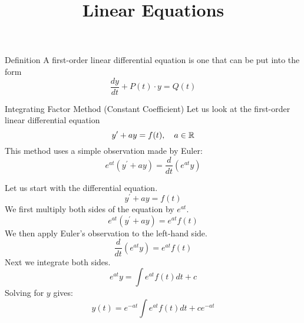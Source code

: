 \documentclass{beamer}
\title[MA230 - Section 9.5]{Linear Equations}
\begin{document}
\begin{frame}
\titlepage
\end{frame}

\begin{frame}
\begin{block}{Definition}
A first-order linear differential equation is one that can be put into the form
\begin{equation*}
\dfrac{dy}{dt}+P(t)\cdot y = Q(t)
\end{equation*}
\end{block}
\begin{block}{Integrating Factor Method (Constant Coefficient)}
Let us look at the first-order linear differential equation
\begin{equation*}
y^\prime+ ay = f(t),\quad a\in\mathbb{R}
\end{equation*}
This method uses a simple observation made by Euler:
\begin{equation*}
e^{at}\left(y^\prime+ay\right) = \dfrac{d}{dt}\left(e^{at} y\right)
\end{equation*}
\begin{overprint}
Let us start with the differential equation.
\begin{equation*}
y^\prime+ ay = f(t)
\end{equation*}
We first multiply both sides of the equation by $e^{at}$.
\begin{equation*}
e^{at}\left(y^\prime+ay\right) = e^{at} f(t) 
\end{equation*}
We then apply Euler's observation to the left-hand side.
\begin{equation*}
\dfrac{d}{dt}\left(e^{at} y\right) = e^{at} f(t) 
\end{equation*}
Next we integrate both sides.
\begin{equation*}
e^{at} y = \int e^{at} f(t)  dt + c
\end{equation*}
Solving for $y$ gives:
\begin{equation*}
y(t) = e^{-at} \int e^{at} f(t)  dt + c e^{-at}
\end{equation*}
\end{overprint}
\end{block}
\end{frame}
\end{document}
